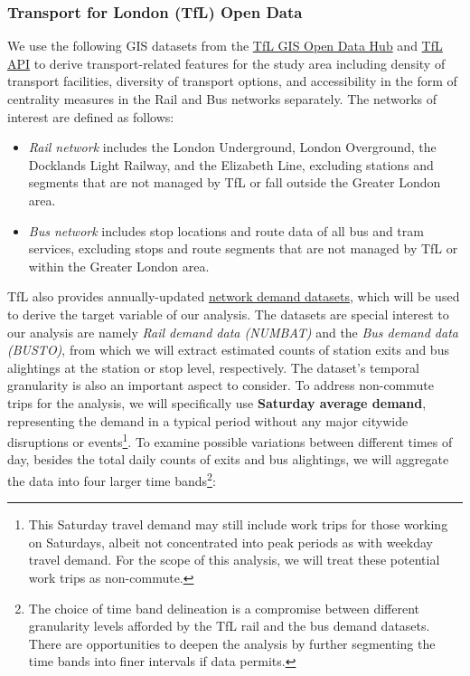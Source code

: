 \subsubsection*{Transport for London (TfL) Open Data}

We use the following GIS datasets from the \href{https://gis-tfl.opendata.arcgis.com/}{TfL GIS Open Data Hub} and \href{https://api.tfl.gov.uk/}{TfL API} to derive transport-related features for the study area including density of transport facilities, diversity of transport options, and accessibility in the form of centrality measures in the Rail and Bus networks separately. The networks of interest are defined as follows:

\begin{itemize}
    \setlength\itemsep{0em}
    \item \textit{Rail network} includes the London Underground, London Overground, the Docklands Light Railway, and the Elizabeth Line, excluding stations and segments that are not managed by TfL or fall outside the Greater London area.
    \item \textit{Bus network} includes stop locations and route data of all bus and tram services, excluding stops and route segments that are not managed by TfL or within the Greater London area.
\end{itemize}

TfL also provides annually-updated \href{http://crowding.data.tfl.gov.uk/}{network demand datasets}, which will be used to derive the target variable of our analysis. The datasets are special interest to our analysis are namely \textit{Rail demand data (NUMBAT)} and the \textit{Bus demand data (BUSTO)}, from which we will extract estimated counts of station exits and bus alightings at the station or stop level, respectively. The dataset's temporal granularity is also an important aspect to consider. To address non-commute trips for the analysis, we will specifically use \textbf{Saturday average demand}, representing the demand in a typical period without any major citywide disruptions or events\footnote{This Saturday travel demand may still include work trips for those working on Saturdays, albeit not concentrated into peak periods as with weekday travel demand. For the scope of this analysis, we will treat these potential work trips as non-commute.}. To examine possible variations between different times of day, besides the total daily counts of exits and bus alightings, we will aggregate the data into four larger time bands\footnote{The choice of time band delineation is a compromise between different granularity levels afforded by the TfL rail and the bus demand datasets. There are opportunities to deepen the analysis by further segmenting the time bands into finer intervals if data permits.}:

